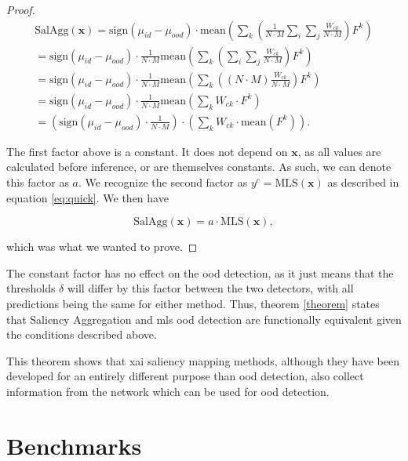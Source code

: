 \documentclass[UKenglish]{uiomasterthesis} %
\theoremstyle{definition}
\begin{document}
\begin{proof}
\begin{gather}
    \text{SalAgg}(\bm{x}) = \text{sign}(\mu_{id} - \mu_{ood}) \cdot \text{mean} \left(\sum_k \left( \frac{1}{N \cdot M} \sum_i \sum_j \frac{W_{ck}}{N \cdot M} \right) F^k \right) \\
    = \text{sign}(\mu_{id} - \mu_{ood}) \cdot \frac{1}{N \cdot M} \text{mean} \left(\sum_k \left(  \sum_i \sum_j \frac{W_{ck}}{N \cdot M}  \right) F^k \right) \\
    = \text{sign}(\mu_{id} - \mu_{ood}) \cdot \frac{1}{N \cdot M} \text{mean} \left(\sum_k \left( (N \cdot M) \frac{W_{ck}}{N \cdot M} \right) F^k \right) \\
    = \text{sign}(\mu_{id} - \mu_{ood}) \cdot \frac{1}{N \cdot M} \text{mean} \left(\sum_k  W_{ck} \cdot F^k \right) \\
    = \left(\text{sign}(\mu_{id} - \mu_{ood}) \cdot \frac{1}{N \cdot M} \right) \cdot \left( \sum_k  W_{ck} \cdot \text{mean}(F^k) \right).
\end{gather}


\noindent The first factor above is a constant. It does not depend on $\bm{x}$, as all values are calculated before inference, or are themselves constants. As such, we can denote this factor as $a$. We recognize the second factor as $y^c = \text{MLS}(\bm{x})$ as described in equation \ref{eq:quick}. We then have

\begin{equation}
    \text{SalAgg}(\bm{x}) = a \cdot \text{MLS}(\bm{x}),
\end{equation}

\noindent which was what we wanted to prove.

\end{proof}

The constant factor has no effect on the \ac{ood} detection, as it just means that the thresholds $\delta$ will differ by this factor between the two detectors, with all predictions being the same for either method. Thus, theorem \ref{theorem} states that Saliency Aggregation and \ac{mls} \ac{ood} detection are functionally equivalent given the conditions described above.

This theorem shows that \ac{xai} saliency mapping methods, although they have been developed for an entirely different purpose than \ac{ood} detection, also collect information from the network which can be used for \ac{ood} detection.

\section{Benchmarks} \label{section:benchmarks}
\end{document}
